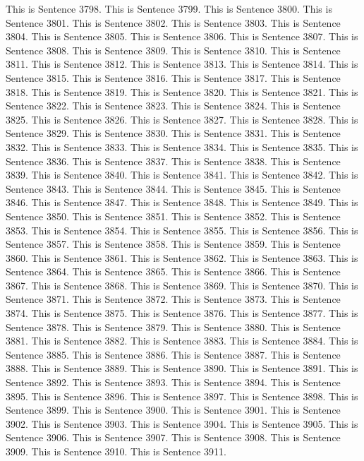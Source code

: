 \documentclass{article}
\begin{document}
This is Sentence 3798.
This is Sentence 3799.
This is Sentence 3800.
This is Sentence 3801.
This is Sentence 3802.
This is Sentence 3803.
This is Sentence 3804.
This is Sentence 3805.
This is Sentence 3806.
This is Sentence 3807.
This is Sentence 3808.
This is Sentence 3809.
This is Sentence 3810.
This is Sentence 3811.
This is Sentence 3812.
This is Sentence 3813.
This is Sentence 3814.
This is Sentence 3815.
This is Sentence 3816.
This is Sentence 3817.
This is Sentence 3818.
This is Sentence 3819.
This is Sentence 3820.
This is Sentence 3821.
This is Sentence 3822.
This is Sentence 3823.
This is Sentence 3824.
This is Sentence 3825.
This is Sentence 3826.
This is Sentence 3827.
This is Sentence 3828.
This is Sentence 3829.
This is Sentence 3830.
This is Sentence 3831.
This is Sentence 3832.
This is Sentence 3833.
This is Sentence 3834.
This is Sentence 3835.
This is Sentence 3836.
This is Sentence 3837.
This is Sentence 3838.
This is Sentence 3839.
This is Sentence 3840.
This is Sentence 3841.
This is Sentence 3842.
This is Sentence 3843.
This is Sentence 3844.
This is Sentence 3845.
This is Sentence 3846.
This is Sentence 3847.
This is Sentence 3848.
This is Sentence 3849.
This is Sentence 3850.
This is Sentence 3851.
This is Sentence 3852.
This is Sentence 3853.
This is Sentence 3854.
This is Sentence 3855.
This is Sentence 3856.
This is Sentence 3857.
This is Sentence 3858.
This is Sentence 3859.
This is Sentence 3860.
This is Sentence 3861.
This is Sentence 3862.
This is Sentence 3863.
This is Sentence 3864.
This is Sentence 3865.
This is Sentence 3866.
This is Sentence 3867.
This is Sentence 3868.
This is Sentence 3869.
This is Sentence 3870.
This is Sentence 3871.
This is Sentence 3872.
This is Sentence 3873.
This is Sentence 3874.
This is Sentence 3875.
This is Sentence 3876.
This is Sentence 3877.
This is Sentence 3878.
This is Sentence 3879.
This is Sentence 3880.
This is Sentence 3881.
This is Sentence 3882.
This is Sentence 3883.
This is Sentence 3884.
This is Sentence 3885.
This is Sentence 3886.
This is Sentence 3887.
This is Sentence 3888.
This is Sentence 3889.
This is Sentence 3890.
This is Sentence 3891.
This is Sentence 3892.
This is Sentence 3893.
This is Sentence 3894.
This is Sentence 3895.
This is Sentence 3896.
This is Sentence 3897.
This is Sentence 3898.
This is Sentence 3899.
This is Sentence 3900.
This is Sentence 3901.
This is Sentence 3902.
This is Sentence 3903.
This is Sentence 3904.
This is Sentence 3905.
This is Sentence 3906.
This is Sentence 3907.
This is Sentence 3908.
This is Sentence 3909.
This is Sentence 3910.
This is Sentence 3911.
\end{document}

